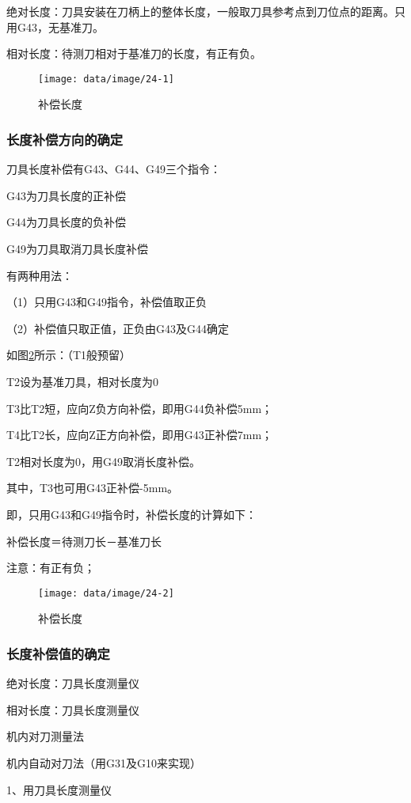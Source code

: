 绝对长度：刀具安装在刀柄上的整体长度，一般取刀具参考点到刀位点的距离。只用G43，无基准刀。

相对长度：待测刀相对于基准刀的长度，有正有负。

\begin{figure}[h]
	\centering
	\texttt{[image: data/image/24-1]}
	\caption{补偿长度}
	\label{fig:24-1}
\end{figure}

\subsubsection{长度补偿方向的确定}

刀具长度补偿有G43、G44、G49三个指令：

G43为刀具长度的正补偿

G44为刀具长度的负补偿

G49为刀具取消刀具长度补偿

有两种用法：

（1）只用G43和G49指令，补偿值取正负

（2）补偿值只取正值，正负由G43及G44确定

如图\ref{fig:24-2}所示：（T1般预留）

T2设为基准刀具，相对长度为0

T3比T2短，应向Z负方向补偿，即用G44负补偿5mm；

T4比T2长，应向Z正方向补偿，即用G43正补偿7mm；

T2相对长度为0，用G49取消长度补偿。

其中，T3也可用G43正补偿-5mm。

即，只用G43和G49指令时，补偿长度的计算如下：

补偿长度＝待测刀长－基准刀长 

注意：有正有负；

\begin{figure}[h]
	\centering
	\texttt{[image: data/image/24-2]}
	\caption{补偿长度}
	\label{fig:24-2}
\end{figure}
\subsubsection{长度补偿值的确定}

绝对长度：刀具长度测量仪

相对长度：刀具长度测量仪

机内对刀测量法

机内自动对刀法（用G31及G10来实现）

1、用刀具长度测量仪



